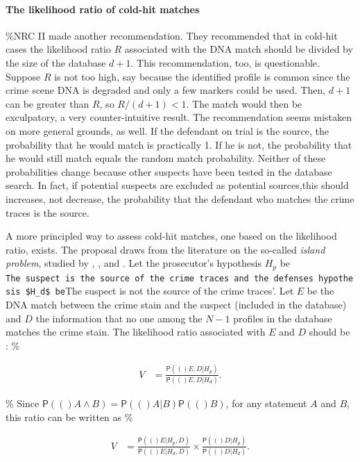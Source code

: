 \documentclass[10pt,dvipsnames,enabledeprecatedfontcommands]{scrartcl}
\let\oldparagraph\paragraph
\renewcommand{\paragraph}[1]{\oldparagraph{#1}\mbox{}}
\newcommand{\pr}[1]{\mathsf{P}(#1)}
\begin{document}
\paragraph{The likelihood ratio of cold-hit matches}

\%NRC II made another recommendation. They recommended that in cold-hit
cases the likelihood ratio \(R\) associated with the DNA match should be
divided by the size of the database \(d+1\). This recommendation, too,
is questionable. Suppose \(R\) is not too high, say because the
identified profile is common since the crime scene DNA is degraded and
only a few markers could be used. Then, \(d+1\) can be greater than
\(R\), so \(R/(d+1)<1\). The match would then be exculpatory, a very
counter-intuitive result. The recommendation seems mistaken on more
general grounds, as well. If the defendant on trial is the source, the
probability that he would match is practically 1. If he is not, the
probability that he would still match equals the random match
probability. Neither of these probabilities change because other
suspects have been tested in the database search. In fact, if potential
suspects are excluded as potential sources,this should increases, not
decrease, the probability that the defendant who matches the crime
traces is the source.

A more principled way to assess cold-hit matches, one based on the
likelihood ratio, exists. The proposal draws from the literature on the
so-called \emph{island problem}, studied by
\citet{eggleston1978evidence}, \citet{dawid1994island}, and
\citet{dawid1996CoherentAnalysisForensic}. Let the prosecutor's
hypothesis \(H_p\) be
\texttt{The\ suspect\ is\ the\ source\ of\ the\ crime\ traces\textquotesingle{}\ and\ the\ defense\textquotesingle{}s\ hypothesis\ \$H\_d\$\ be}The
suspect is not the source of the crime traces'. Let \(E\) be the DNA
match between the crime stain and the suspect (included in the database)
and \(D\) the information that no one among the \(N-1\) profiles in the
database matches the crime stain. The likelihood ratio associated with
\(E\) and \(D\) should be
\citep{balding1996EvaluatingDNAProfilea, taroni2006bayesian}: \%

\begin{align*}
V & = \frac{\pr(E,D\vert H_p)}{\pr(E,D\vert H_d)}.
\end{align*}

\% Since \(\pr(A\wedge B)=\pr(A\vert B)\pr(B)\), for any statement \(A\)
and \(B\), this ratio can be written as \%

\begin{align*}
V & = \frac{\pr(E\vert H_p,D)}{\pr(E\vert H_d,D)} \times \frac{\pr(D\vert H_p)}{\pr(D\vert H_d)}.
\end{align*}
\end{document}
